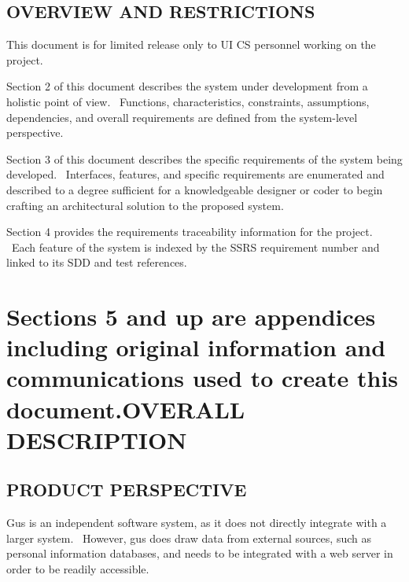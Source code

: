 \documentclass[letterpaper]{article}
\newcommand\textstyleDefaultParagraphFont[1]{#1}
\begin{document}
\subsection[OVERVIEW AND RESTRICTIONS]{\rmfamily OVERVIEW AND
RESTRICTIONS}
{\color{black}
This document is for limited release only to UI CS personnel working on
the project.}


\bigskip

{\color{black}
Section 2 of this document describes the system under development from a
holistic point of view. \ Functions, characteristics, constraints,
assumptions, dependencies, and overall requirements are defined from
the system-level perspective.}


\bigskip

{\color{black}
Section 3 of this document describes the specific requirements of the
system being developed. \ Interfaces, features, and specific
requirements are enumerated and described to a degree sufficient for a
knowledgeable designer or coder to begin crafting an architectural
solution to the proposed system.}


\bigskip

{\color{black}
Section 4 provides the requirements traceability information for the
project. \ Each feature of the system is indexed by the SSRS
requirement number and linked to its SDD and test references.}


\bigskip

\section[Sections 5 and up are appendices including original information
and communications used to create this document.OVERALL
DESCRIPTION]{\textstyleDefaultParagraphFont{\textmd{Sections 5 and up
are appendices including original information and communications used
to create this document.}}\textstyleDefaultParagraphFont{OVERALL
DESCRIPTION}}
\subsection[PRODUCT PERSPECTIVE]{\rmfamily PRODUCT PERSPECTIVE}

\bigskip

{\color{black}
Gus is an independent software system, as it does not directly integrate
with a larger system. \ However, gus does draw data from external
sources, such as personal information databases, and needs to be
integrated with a web server in order to be readily accessible.}
\end{document}
